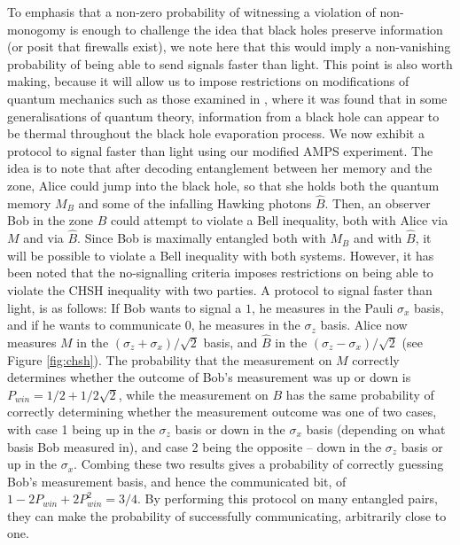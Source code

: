 \documentclass[11pt,a4paper]{article}
\begin{document}
To emphasis that a non-zero probability of witnessing a violation of non-monogomy is enough to challenge the idea that black holes preserve information (or posit that firewalls exist), we note here that this would imply a non-vanishing probability of being able to send signals faster than light. This point is also worth making, because it will allow us to impose restrictions on modifications of quantum mechanics such as those examined in \cite{muller2012black}, where it was found that in some generalisations of quantum theory, information from a black hole can appear to be thermal throughout the black hole evaporation process.
We now exhibit a protocol to signal faster than light using our modified AMPS experiment. The idea is to note that after decoding entanglement between her memory and the zone, Alice could jump into the black hole, so that she holds both  the quantum memory $M_B$ and some of the infalling Hawking photons ${\hat B}$. Then, an observer Bob in the zone $B$ could attempt to violate a Bell inequality, both with Alice via $M$ and via ${\hat B}$. Since Bob is maximally entangled both with $M_B$ and with  ${\hat B}$, it will be possible to violate a Bell inequality with both systems.  However, it has been noted that the no-signalling criteria imposes restrictions on being able to violate the CHSH inequality\cite{clauser1969proposed}  with two parties\cite{toner2006monogamy}. A protocol to signal faster than light, is as follows: If Bob wants to signal a $1$, he measures in the Pauli $\sigma_x$ basis, and if he wants to communicate $0$, he measures in the $\sigma_z$ basis. Alice now measures $M$ in the $(\sigma_z+\sigma_x)/\sqrt{2}$ basis, and ${\hat B}$ in the $(\sigma_z-\sigma_x)/\sqrt{2}$ (see Figure \ref{fig:chsh}). The probability that the measurement on $M$ correctly determines whether the outcome of Bob's measurement was up or down is $P_{win}=1/2+1/2\sqrt{2}$, while the measurement on $B$ has the same probability of correctly determining whether the measurement outcome was one of two cases, with case 1 being up in the $\sigma_z$ basis or down in the $\sigma_x$ basis (depending on what basis Bob measured in), and case 2 being the opposite -- down in the $\sigma_z$ basis or up in the $\sigma_x$. Combing these two results gives a probability of correctly guessing Bob's measurement basis, and hence the communicated bit, of $1-2P_{win}+2P^2_{win}=3/4$. By performing this protocol on many entangled pairs, they can make the probability of successfully communicating, arbitrarily close to one.
\end{document}
